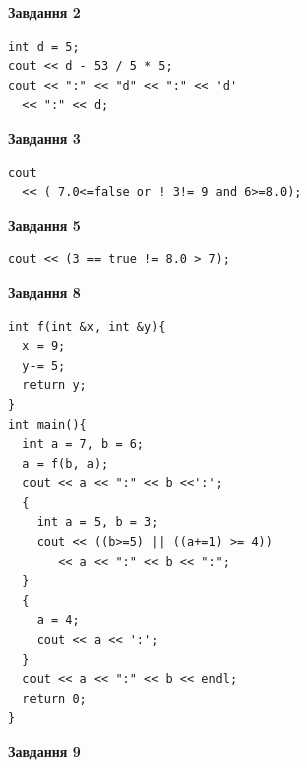 \documentclass[12pt, ukrainian]{article}
\begin{document}
{\begin {large}
\begin{minipage}[t]{7.0cm}
\end{minipage}
\vline \hspace{1mm}
\begin{minipage}[t]{11.0cm}

\begin{center}
\textbf{Завдання 2}
\end{center}
\vspace{-8mm}

\begin{verbatim}
int d = 5;
cout << d - 53 / 5 * 5;
cout << ":" << "d" << ":" << 'd' 
  << ":" << d;
\end{verbatim}



\begin{center}
\textbf{Завдання 3}
\end{center}
\vspace{-8mm}

\begin{verbatim}
cout 
  << ( 7.0<=false or ! 3!= 9 and 6>=8.0);
\end{verbatim}



\begin{center}
\textbf{Завдання 5}
\end{center}
\vspace{-8mm}

\begin{verbatim}
cout << (3 == true != 8.0 > 7);
\end{verbatim}



\begin{center}
\textbf{Завдання 8}
\end{center}
\vspace{-8mm}

\begin{verbatim}
int f(int &x, int &y){
  x = 9;
  y-= 5;
  return y;
}
int main(){
  int a = 7, b = 6;
  a = f(b, a);
  cout << a << ":" << b <<':';
  {
    int a = 5, b = 3;
    cout << ((b>=5) || ((a+=1) >= 4))
       << a << ":" << b << ":";
  }
  {
    a = 4;
    cout << a << ':';
  }
  cout << a << ":" << b << endl;
  return 0;
}
\end{verbatim}

\end{minipage}


\begin{minipage}[t]{7.0cm}

\begin{center}
\textbf{Завдання 9}
\end{center}
\vspace{-8mm}


\end{minipage}
\end{large}}
\end{document}
